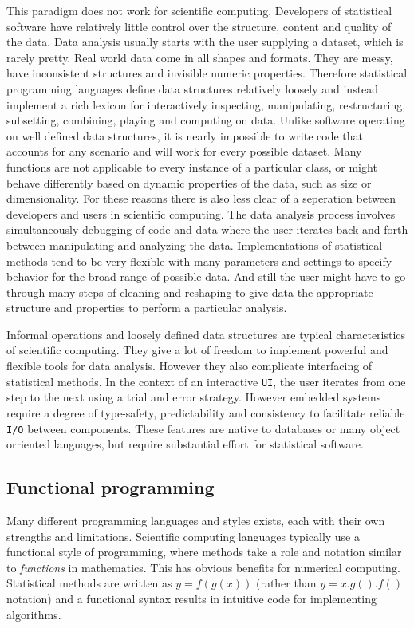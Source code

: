 \documentclass{article}
\newcommand{\UI}{\texttt{UI}\xspace}
\begin{document}
This paradigm does not work for scientific computing. Developers of statistical software have relatively little control over the structure, content and quality of the data. Data analysis usually starts with the user supplying a dataset, which is rarely pretty. Real world data come in all shapes and formats. They are messy, have inconsistent structures and invisible numeric properties. Therefore statistical programming languages define data structures relatively loosely and instead implement a rich lexicon for interactively inspecting, manipulating, restructuring, subsetting, combining, playing and computing on data. Unlike software operating on well defined data structures, it is nearly impossible to write code that accounts for any scenario and will work for every possible dataset. Many functions are not applicable to every instance of a particular class, or might behave differently based on dynamic properties of the data, such as size or dimensionality. For these reasons there is also less clear of a seperation between developers and users in scientific computing. The data analysis process involves simultaneously debugging of code and data where the user iterates back and forth between manipulating and analyzing the data. Implementations of statistical methods tend to be very flexible with many parameters and settings to specify behavior for the broad range of possible data. And still the user might have to go through many steps of cleaning and reshaping to give data the appropriate structure and properties to perform a particular analysis. 

Informal operations and loosely defined data structures are typical characteristics of scientific computing. They give a lot of freedom to implement powerful and flexible tools for data analysis. However they also complicate interfacing of statistical methods. In the context of an interactive \UI, the user iterates from one step to the next using a trial and error strategy. However embedded systems require a degree of type-safety, predictability and consistency to facilitate reliable \texttt{I/O} between components. These features are native to databases or many object orriented languages, but require substantial effort for statistical software. 


\subsection{Functional programming}

Many different programming languages and styles exists, each with their own strengths and limitations. Scientific computing languages typically use a functional style of programming, where methods take a role and notation similar to \emph{functions} in mathematics. This has obvious benefits for numerical computing. Statistical methods are written as $y = f(g(x))$ (rather than $y = x.g().f()$ notation) and a functional syntax results in intuitive code for implementing algorithms. 
\end{document}
